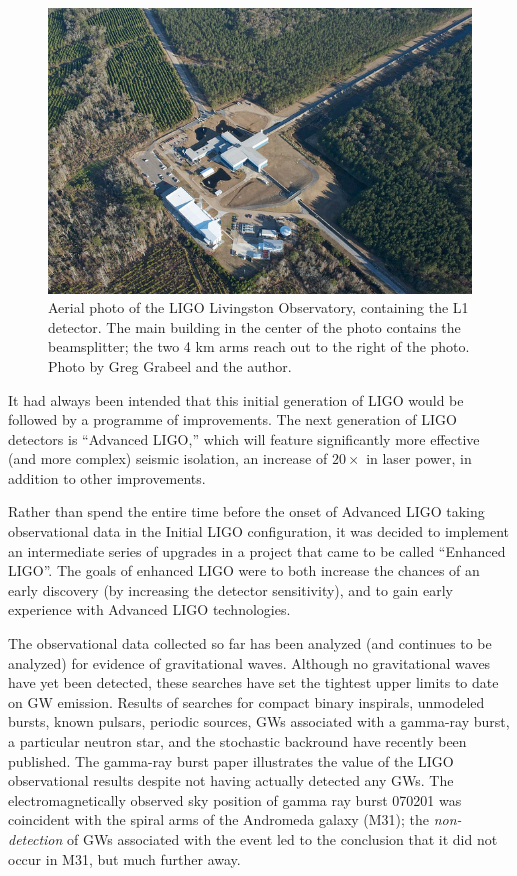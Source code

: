 \begin{figure}
\centerline{\includegraphics[width=0.8\columnwidth]{figures/5413583267_69eb527273_z.jpg}}
\caption[Aerial photo of LIGO Livingston Observatory]{
\label{fig:aerial-photo}Aerial photo of the LIGO Livingston Observatory, 
containing the L1 detector.  The main building in the center of the photo
contains the beamsplitter; the two 4 km arms reach out to the right of the 
photo.  Photo by Greg Grabeel and the author.  }
\end{figure}

It had always been intended that this initial generation of LIGO would
be followed by a programme of improvements\cite{Abramovici1992LIGO}.  The next generation of
LIGO detectors is ``Advanced LIGO,'' which will feature significantly
more effective (and more complex) seismic isolation, an increase of
$20\times$ in laser power, in addition to other improvements.

Rather than spend the entire time before the onset of Advanced LIGO
taking observational data in the Initial LIGO configuration, it was
decided to implement an intermediate series of upgrades in a project
that came to be called ``Enhanced
LIGO''\cite{Adhikari2006Enhanced,T050252,JoshSmithEnhancedAdvanced}.
The goals of enhanced LIGO were to both increase the chances of an
early discovery (by increasing the detector sensitivity), and to gain
early experience with Advanced LIGO technologies.

The observational data collected so far has been analyzed (and
continues to be analyzed) for evidence of gravitational waves.
Although no gravitational waves have yet been detected, these searches
have set the tightest upper limits to date on GW emission.  Results of
searches for compact binary inspirals\cite{S5CBCnospin, S5CBC5months},
unmodeled bursts\cite{Abbott2009Search, S5burst}, known pulsars\cite{S5knownpulsars},
periodic sources\cite{S5periodic},
GWs associated with a gamma-ray burst\cite{S5GRB070201},
a particular neutron star\cite{Abadie2010First},
and the stochastic backround\cite{S5NatureStochastic} have recently
been published.  The gamma-ray burst paper\cite{S5GRB070201} illustrates
the value of the LIGO observational results despite not having actually
detected any GWs.  The electromagnetically observed sky position of gamma
ray burst 070201 was coincident with the spiral arms of the Andromeda galaxy (M31);
the \emph{non-detection} of GWs associated with the event led to the conclusion that it did not occur in M31, but much further away.


